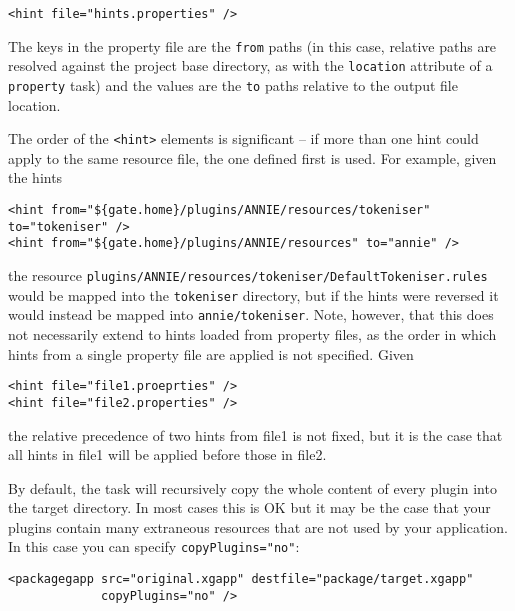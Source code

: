 \begin{verbatim}
<hint file="hints.properties" />
\end{verbatim}

The keys in the property file are the \texttt{from} paths (in this case,
relative paths are resolved against the project base directory, as with the
\texttt{location} attribute of a \texttt{property} task) and the values are the
\texttt{to} paths relative to the output file location.

The order of the \verb|<hint>| elements is significant -- if more than one hint
could apply to the same resource file, the one defined first is used.  For
example, given the hints

\begin{small}
\begin{verbatim}
<hint from="${gate.home}/plugins/ANNIE/resources/tokeniser" to="tokeniser" />
<hint from="${gate.home}/plugins/ANNIE/resources" to="annie" />
\end{verbatim}
\end{small}

the resource \texttt{plugins/ANNIE/resources/tokeniser/DefaultTokeniser.rules}
would be mapped into the \texttt{tokeniser} directory, but if the hints were
reversed it would instead be mapped into \texttt{annie/tokeniser}.  Note,
however, that this does not necessarily extend to hints loaded from property
files, as the order in which hints from a single property file are applied is
not specified.  Given

\begin{small}
\begin{verbatim}
<hint file="file1.proeprties" />
<hint file="file2.properties" />
\end{verbatim}
\end{small}

the relative precedence of two hints from file1 is not fixed, but it is the
case that all hints in file1 will be applied before those in file2.


By default, the task will recursively copy the whole content of every plugin
into the target directory.  In most cases this is OK but it may be the case
that your plugins contain many extraneous resources that are not used by your
application.  In this case you can specify \verb|copyPlugins="no"|:
\begin{small}
\begin{verbatim}
<packagegapp src="original.xgapp" destfile="package/target.xgapp"
             copyPlugins="no" />
\end{verbatim}
\end{small}

